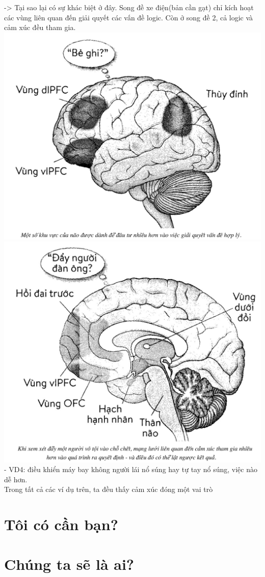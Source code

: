 \documentclass{article}
\newcommand\tab[1][1cm]{\hspace*{#1}}
\begin{document}
\tab -> Tại sao lại có sự khác biệt ở đây. Song đề xe điện(bản cần gạt) chỉ kích hoạt các vùng liên quan đến 
giải quyết các vấn đề logic. Còn ở song đề 2, cả logic và cảm xúc đều tham gia.\\
\includegraphics[width=\textwidth]{images/logic.png}
\includegraphics[width=\textwidth]{images/logicemotion.png}
\tab - VD4: điều khiển máy bay không người lái nổ súng hay tự tay nổ súng, việc nào dễ hơn.\\
\tab Trong tất cả các ví dụ trên, ta đều thấy cảm xúc đóng một vai trò 
\section{Tôi có cần bạn?}
\section{Chúng ta sẽ là ai?}
\end{document}
